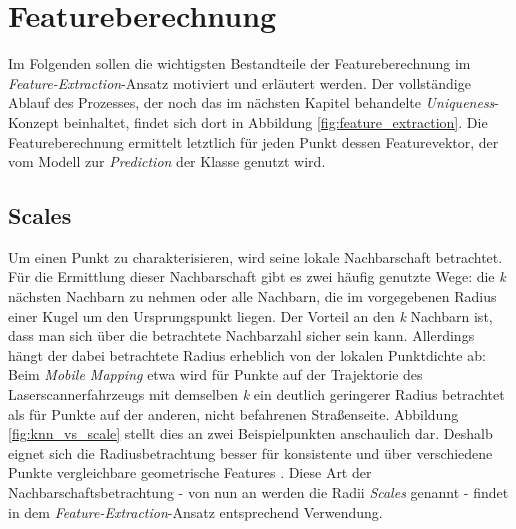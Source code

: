 
\chapter{Featureberechnung}
\label{chap:feature-calc}

Im Folgenden sollen die wichtigsten Bestandteile der Featureberechnung im \textit{Feature-Extraction}-Ansatz motiviert und erläutert werden. Der vollständige Ablauf des Prozesses, der noch das im nächsten Kapitel behandelte \textit{Uniqueness}-Konzept beinhaltet, findet sich dort in Abbildung \ref{fig:feature_extraction}. Die Featureberechnung ermittelt letztlich für jeden Punkt dessen Featurevektor, der vom Modell zur \textit{Prediction} der Klasse genutzt wird.

\section{Scales}

Um einen Punkt zu charakterisieren, wird seine lokale Nachbarschaft betrachtet. Für die Ermittlung dieser Nachbarschaft gibt es zwei häufig genutzte Wege: die \textit{k} nächsten Nachbarn zu nehmen oder alle Nachbarn, die im vorgegebenen Radius einer Kugel um den Ursprungspunkt liegen. Der Vorteil an den \textit{k} Nachbarn ist, dass man sich über die betrachtete Nachbarzahl sicher sein kann. Allerdings hängt der dabei betrachtete Radius erheblich von der lokalen Punktdichte ab: Beim \textit{Mobile Mapping} etwa wird für Punkte auf der Trajektorie des Laserscannerfahrzeugs mit demselben \textit{k} ein deutlich geringerer Radius betrachtet als für Punkte auf der anderen, nicht befahrenen Straßenseite. Abbildung \ref{fig:knn_vs_scale} stellt dies an zwei Beispielpunkten anschaulich dar. Deshalb eignet sich die Radiusbetrachtung besser für konsistente und über verschiedene Punkte vergleichbare geometrische Features \citep{Thomas.etal-2018}. Diese Art der Nachbarschaftsbetrachtung - von nun an werden die Radii \textit{Scales} genannt - findet in dem \textit{Feature-Extraction}-Ansatz entsprechend Verwendung. \\

